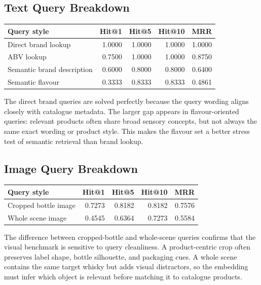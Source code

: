 \subsection{Text Query Breakdown}

\begin{center}
\begin{tabular}{lrrrr}
\hline
\textbf{Query style} & \textbf{Hit@1} & \textbf{Hit@5} & \textbf{Hit@10} & \textbf{MRR} \\
\hline
Direct brand lookup & 1.0000 & 1.0000 & 1.0000 & 1.0000 \\
ABV lookup & 0.7500 & 1.0000 & 1.0000 & 0.8750 \\
Semantic brand description & 0.6000 & 0.8000 & 0.8000 & 0.6400 \\
Semantic flavour & 0.3333 & 0.8333 & 0.8333 & 0.4861 \\
\hline
\end{tabular}
\end{center}

The direct brand queries are solved perfectly because the query wording aligns closely with catalogue metadata. The larger gap appears in flavour-oriented queries: relevant products often share broad sensory concepts, but not always the same exact wording or product style. This makes the flavour set a better stress test of semantic retrieval than brand lookup.

\subsection{Image Query Breakdown}

\begin{center}
\begin{tabular}{lrrrr}
\hline
\textbf{Query style} & \textbf{Hit@1} & \textbf{Hit@5} & \textbf{Hit@10} & \textbf{MRR} \\
\hline
Cropped bottle image & 0.7273 & 0.8182 & 0.8182 & 0.7576 \\
Whole scene image & 0.4545 & 0.6364 & 0.7273 & 0.5584 \\
\hline
\end{tabular}
\end{center}

The difference between cropped-bottle and whole-scene queries confirms that the visual benchmark is sensitive to query cleanliness. A product-centric crop often preserves label shape, bottle silhouette, and packaging cues. A whole scene contains the same target whisky but adds visual distractors, so the embedding must infer which object is relevant before matching it to catalogue products.

